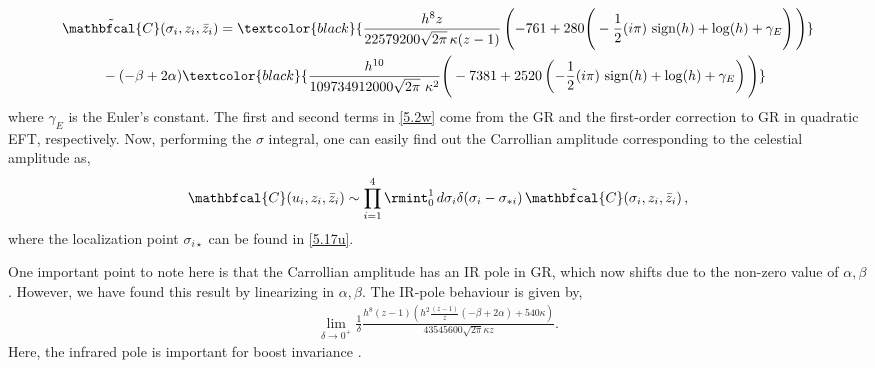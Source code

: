 \begin{align}
\begin{split}&\label{5.2w}
    \tilde{\mathbfcal{C}}(\sigma_i,z_i,\bar z_i)=\textcolor{black}{\frac{h^8z}{{22579200 \sqrt{2 \pi }\,\kappa (z-1)}} \left(-761+280 \Bigg(-\frac{1}{2} (i \pi ) \text{ sign}(h)+\log (h)+\gamma_E \right)\Bigg)}\\&\hspace{1 cm}-(-\beta+2\alpha)\textcolor{black}{\frac{h^{10}}{{109734912000 \sqrt{2 \pi } \,\,\kappa^2 }} \Bigg(-7381+2520 \left(-\frac{1}{2} (i \pi ) \text{ sign}(h)+\log (h)+\gamma_E\right)\Bigg)}
    \end{split}
\end{align}
where $\gamma_E$ is the Euler's constant. The first and second terms in \eqref{5.2w} come from the GR and the first-order correction to GR in quadratic EFT, respectively.  Now, performing the $\sigma$ integral, one can easily find out the Carrollian amplitude corresponding to the celestial amplitude as,
\begin{align}
   \mathbfcal{C}(u_i,z_i,\bar z_i)\sim \prod_{i=1}^4 \rmint_0^1\,d\sigma_i \delta(\sigma_i  - \sigma_{*i})\,\tilde{\mathbfcal{C}}(\sigma_i,z_i,\bar z_i)\,,
\end{align}
where the localization point $\sigma_{i\star}$ can be found in \eqref{5.17u}. \par
One important point to note here is that the Carrollian amplitude has an IR pole in GR, which now shifts due to the non-zero value of $\alpha,\beta$. However, we have found this result by linearizing in $\alpha,\beta$. The IR-pole behaviour is given by,
\begin{align}
  \lim_{\delta\to 0^{+}} \frac{1}{\delta} \frac{h^8(z-1) \left(h^2\frac{ (z-1)}{z} (-\beta +2 \alpha )+540 \kappa\right)}{43545600 \sqrt{2 \pi }   \kappa z}.
\end{align}
Here, the infrared pole is important for boost invariance \cite{Donnay:2022wvx}.
